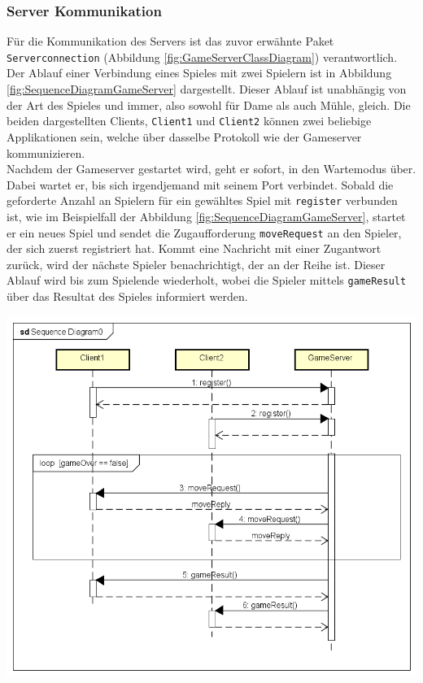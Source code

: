 \documentclass[12pt,a4paper,bibliography=totocnumbered,listof=totocnumbered]{article}
\begin{document}
\subsubsection{Server Kommunikation}
Für die Kommunikation des Servers ist das zuvor erwähnte Paket \texttt{Serverconnection} (Abbildung \ref{fig:GameServerClassDiagram}) verantwortlich.
Der Ablauf einer Verbindung eines Spieles mit zwei Spielern ist in Abbildung \ref{fig:SequenceDiagramGameServer} dargestellt. 
Dieser Ablauf ist unabhängig von der Art des Spieles und immer, also sowohl für Dame als auch Mühle, gleich.
Die beiden dargestellten Clients, \texttt{Client1} und \texttt{Client2} können zwei beliebige Applikationen sein, welche über dasselbe Protokoll
wie der Gameserver kommunizieren.
\\
Nachdem der Gameserver gestartet wird, geht er sofort, in den Wartemodus über. Dabei wartet er, bis sich irgendjemand
mit seinem Port verbindet. Sobald die geforderte Anzahl an Spielern für ein gewähltes Spiel mit \texttt{register} 
verbunden ist, wie im Beispielfall der Abbildung \ref{fig:SequenceDiagramGameServer}, 
startet er ein neues Spiel und sendet die Zugaufforderung \texttt{moveRequest} 
an den Spieler, der sich zuerst registriert hat. Kommt eine Nachricht mit einer Zugantwort zurück,
wird der nächste Spieler benachrichtigt, der an der Reihe ist. Dieser Ablauf wird bis zum Spielende wiederholt, wobei die Spieler mittels \texttt{gameResult}
über das Resultat des Spieles informiert werden.
\\


\vspace{1em}
\begin{minipage}{\linewidth}
	\centering
	\includegraphics[width=0.7\linewidth]{pics/SequenceDiagramGameServer.png}
	\label{fig:SequenceDiagramGameServer}
\end{minipage}
\end{document}
